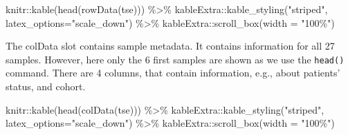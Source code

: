\documentclass[
  oneside]{book}
\newenvironment{Shaded}{\begin{snugshade}}{\end{snugshade}}
\newcommand{\AttributeTok}[1]{\textcolor[rgb]{0.77,0.63,0.00}{#1}}
\newcommand{\FunctionTok}[1]{\textcolor[rgb]{0.00,0.00,0.00}{#1}}
\newcommand{\NormalTok}[1]{#1}
\newcommand{\SpecialCharTok}[1]{\textcolor[rgb]{0.00,0.00,0.00}{#1}}
\newcommand{\StringTok}[1]{\textcolor[rgb]{0.31,0.60,0.02}{#1}}
\begin{document}
\begin{Shaded}
\begin{Highlighting}[]
\NormalTok{knitr}\SpecialCharTok{::}\FunctionTok{kable}\NormalTok{(}\FunctionTok{head}\NormalTok{(}\FunctionTok{rowData}\NormalTok{(tse))) }\SpecialCharTok{\%\textgreater{}\%} 
\NormalTok{  kableExtra}\SpecialCharTok{::}\FunctionTok{kable\_styling}\NormalTok{(}\StringTok{"striped"}\NormalTok{, }
                            \AttributeTok{latex\_options=}\StringTok{"scale\_down"}\NormalTok{) }\SpecialCharTok{\%\textgreater{}\%} 
\NormalTok{  kableExtra}\SpecialCharTok{::}\FunctionTok{scroll\_box}\NormalTok{(}\AttributeTok{width =} \StringTok{"100\%"}\NormalTok{)}
\end{Highlighting}
\end{Shaded}

\begin{table}
\centering
{}
\end{table}

The colData slot contains sample metadata. It contains information for all 27 samples.
However, here only the 6 first samples are shown as we use the \texttt{head()} command. There
are 4 columns, that contain information, e.g., about patients' status, and cohort.

\begin{Shaded}
\begin{Highlighting}[]
\NormalTok{knitr}\SpecialCharTok{::}\FunctionTok{kable}\NormalTok{(}\FunctionTok{head}\NormalTok{(}\FunctionTok{colData}\NormalTok{(tse))) }\SpecialCharTok{\%\textgreater{}\%} 
\NormalTok{  kableExtra}\SpecialCharTok{::}\FunctionTok{kable\_styling}\NormalTok{(}\StringTok{"striped"}\NormalTok{, }
                            \AttributeTok{latex\_options=}\StringTok{"scale\_down"}\NormalTok{) }\SpecialCharTok{\%\textgreater{}\%} 
\NormalTok{  kableExtra}\SpecialCharTok{::}\FunctionTok{scroll\_box}\NormalTok{(}\AttributeTok{width =} \StringTok{"100\%"}\NormalTok{)}
\end{Highlighting}
\end{Shaded}
\end{document}
